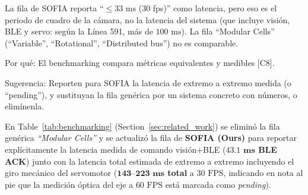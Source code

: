 \documentclass{LabDSTresponse}
\begin{document}
{La fila de SOFIA reporta “$\le 33\text{ ms}$ (30 fps)” como latencia, pero eso es el periodo de cuadro de la cámara, no la latencia del sistema (que incluye visión, BLE y servo: según la Línea 591, más de $100\text{ ms}$). La fila “Modular Cells” (“Variable”, “Rotational”, “Distributed bus”) no es comparable.

Por qué: El benchmarking compara métricas equivalentes y medibles [C8].

Sugerencia: Reporten para SOFIA la latencia de extremo a extremo medida (o “pending”), y sustituyan la fila genérica por un sistema concreto con números, o elimínenla.}
{En Table~\ref{tab:benchmarking} (Section~\ref{sec:related_work}) se eliminó la fila genérica \textit{``Modular Cells''} y se actualizó la fila de \textbf{SOFIA (Ours)} para reportar explícitamente la latencia medida de comando visión+BLE (\textbf{$\mathbf{43.1\text{ ms}}$ BLE ACK}) junto con la latencia total estimada de extremo a extremo incluyendo el giro mecánico del servomotor (\textbf{$\mathbf{143\text{--}223\text{ ms}}$ total} a $30\text{ FPS}$, indicando en nota al pie que la medición óptica del eje a $60\text{ FPS}$ está marcada como \textit{pending}).}
\end{document}
